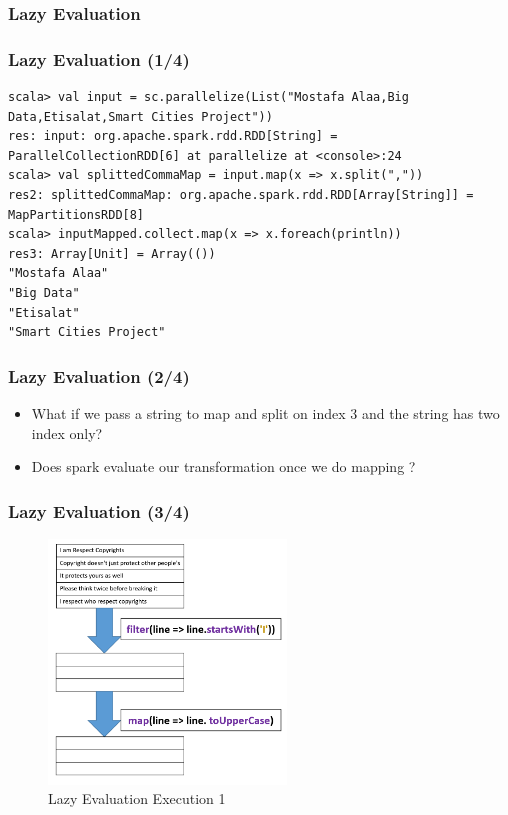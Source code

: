 \subsubsection{Lazy Evaluation}

\begin{frame}[fragile]
	  \frametitle{Lazy Evaluation (1/4)}
\begin{itemize}[<+->]
			\begin{lstlisting}[style=myScalastyle, caption=Spark Lazy Execution Example]
scala> val input = sc.parallelize(List("Mostafa Alaa,Big Data,Etisalat,Smart Cities Project"))
res: input: org.apache.spark.rdd.RDD[String] = ParallelCollectionRDD[6] at parallelize at <console>:24
scala> val splittedCommaMap = input.map(x => x.split(","))
res2: splittedCommaMap: org.apache.spark.rdd.RDD[Array[String]] = MapPartitionsRDD[8]	
scala> inputMapped.collect.map(x => x.foreach(println))
res3: Array[Unit] = Array(())
"Mostafa Alaa"
"Big Data"
"Etisalat"
"Smart Cities Project"
			\end{lstlisting}

\end{itemize}
\end{frame}


\begin{frame}
	  \frametitle{Lazy Evaluation (2/4)}
\begin{itemize}[<+->]
	\item What if we pass a string to map and split on index 3 and the string has two index only?
	\item Does spark evaluate our transformation once we do mapping ?
\end{itemize}
\end{frame}

\begin{frame}
	  \frametitle{Lazy Evaluation (3/4)}
	    \begin{figure}
	  	\caption{Lazy Evaluation Execution 1}  
	  			  	
			\includegraphics[width=\textwidth,height=6.5cm]{Graphics/lazy1.PNG}
		\end{figure}
\end{frame}

